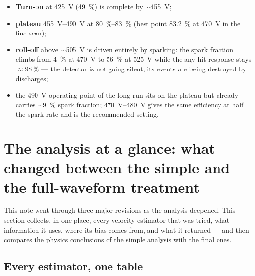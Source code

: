 \documentclass[11pt,a4paper]{article}
\begin{document}
\begin{itemize}
  \item \textbf{Turn-on} at \SI{425}{V} (\SI{49}{\percent}) is complete by
        $\sim$\SI{455}{V};
  \item \textbf{plateau} \SIrange{455}{490}{V} at \SIrange{80}{83}{\percent}
        (best point \SI{83.2}{\percent} at \SI{470}{V} in the fine scan);
  \item \textbf{roll-off} above $\sim$\SI{505}{V} is driven entirely by
        sparking: the spark fraction climbs from \SI{4}{\percent} at
        \SI{470}{V} to \SI{56}{\percent} at \SI{525}{V} while the any-hit
        response stays $\approx\SI{98}{\percent}$ --- the detector is not
        going silent, its events are being destroyed by discharges;
  \item the \SI{490}{V} operating point of the long run sits on the plateau
        but already carries $\sim$\SI{9}{\percent} spark fraction;
        \SIrange{470}{480}{V} gives the same efficiency at half the spark
        rate and is the recommended setting.
\end{itemize}

\section{The analysis at a glance: what changed between the simple and
         the full-waveform treatment}
\label{sec:atglance}

This note went through three major revisions as the analysis deepened.
This section collects, in one place, every velocity estimator that was
tried, what information it uses, where its bias comes from, and what it
returned --- and then compares the physics conclusions of the simple
analysis with the final ones.

\subsection{Every estimator, one table}
\end{document}
